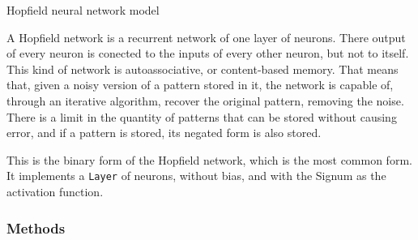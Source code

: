 Hopfield neural network model

A Hopfield network is a recurrent network of one layer of neurons. There
output of every neuron is conected to the inputs of every other neuron, but
not to itself. This kind of network is autoassociative, or content-based
memory. That means that, given a noisy version of a pattern stored in it,
the network is capable of, through an iterative algorithm, recover the
original pattern, removing the noise. There is a limit in the quantity of
patterns that can be stored without causing error, and if a pattern is
stored, its negated form is also stored.

This is the binary form of the Hopfield network, which is the most common
form. It implements a \texttt{Layer} of neurons, without bias, and with the
Signum as the activation function.


  \subsubsection{Methods}

    \vspace{0.5ex}

